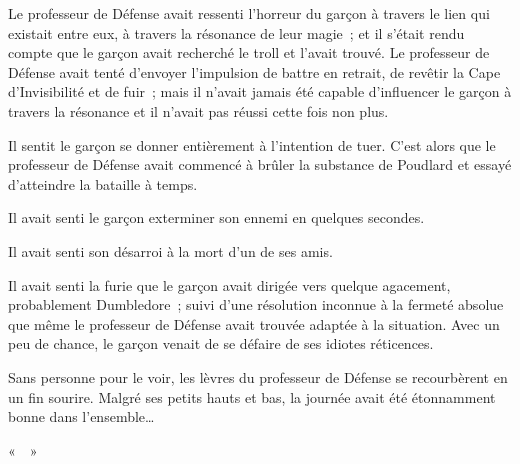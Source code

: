 Le professeur de Défense avait ressenti l'horreur du garçon à travers le lien qui existait entre eux, à travers la résonance de leur magie~; et il s'était rendu compte que le garçon avait recherché le troll et l'avait trouvé.
Le professeur de Défense avait tenté d'envoyer l'impulsion de battre en retrait, de revêtir la Cape d'Invisibilité et de fuir~; mais il n'avait jamais été capable d'influencer le garçon à travers la résonance et il n'avait pas réussi cette fois non plus.

Il sentit le garçon se donner entièrement à l'intention de tuer.
C'est alors que le professeur de Défense avait commencé à brûler la substance de Poudlard et essayé d'atteindre la bataille à temps.

Il avait senti le garçon exterminer son ennemi en quelques secondes.

Il avait senti son désarroi à la mort d'un de ses amis.

Il avait senti la furie que le garçon avait dirigée vers quelque agacement, probablement Dumbledore~; suivi d'une résolution inconnue à la fermeté absolue que même le professeur de Défense avait trouvée adaptée à la situation.
Avec un peu de chance, le garçon venait de se défaire de ses idiotes réticences.

Sans personne pour le voir, les lèvres du professeur de Défense se recourbèrent en un fin sourire.
Malgré ses petits hauts et bas, la journée avait été étonnamment bonne dans l'ensemble…

«~~»
